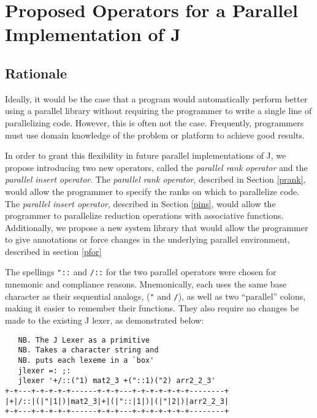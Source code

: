 \chapter{Proposed Operators for a Parallel Implementation of J} 
\label{paraop}

\section{Rationale}
Ideally, it would be the case that a program would automatically perform better using a parallel library 
without requiring the programmer to write a single line of parallelizing code. 
However, this is often not the case. 
Frequently, programmers must use domain knowledge of the problem or platform to achieve good results. 

In order to grant this flexibility in future parallel implementations of J, 
we propose introducing two new operators, called the \textit{parallel rank operator} 
and the \textit{parallel insert operator}.
The \textit{parallel rank operator}, described in Section \ref{prank}, 
would allow the programmer to specify the ranks on which to parallelize code.
The \textit{parallel insert operator}, described in Section \ref{pins}, 
would allow the programmer to parallelize reduction operations with associative functions.
Additionally, we propose a new system library
that would allow the programmer to give annotations or force changes in the underlying parallel environment,
described in section \ref{pfor}

The spellings \texttt{"::}  and \texttt{/::} for the two parallel operators were chosen for mnemonic and compliance reasons.
Mnemonically, each uses the same base character as their sequential analogs, (\texttt{"} and \texttt{/}), 
as well as two ``parallel'' colons, making it easier to remember their functions.
They also require no changes be made to the existing J lexer\cite{ioj}, 
as demonstrated below:

\begin{singlespacing}
\begin{small}
\begin{verbatim}
   NB. The J Lexer as a primitive
   NB. Takes a character string and 
   NB. puts each lexeme in a `box'
   jlexer =: ;:
   jlexer '+/::("1) mat2_3 +("::1)("2) arr2_2_3'
+-+---+-+-+-+-+------+-+-+---+-+-+-+-+-+-+--------+
|+|/::|(|"|1|)|mat2_3|+|(|"::|1|)|(|"|2|)|arr2_2_3|
+-+---+-+-+-+-+------+-+-+---+-+-+-+-+-+-+--------+
\end{verbatim}
\end{small}
\end{singlespacing}

